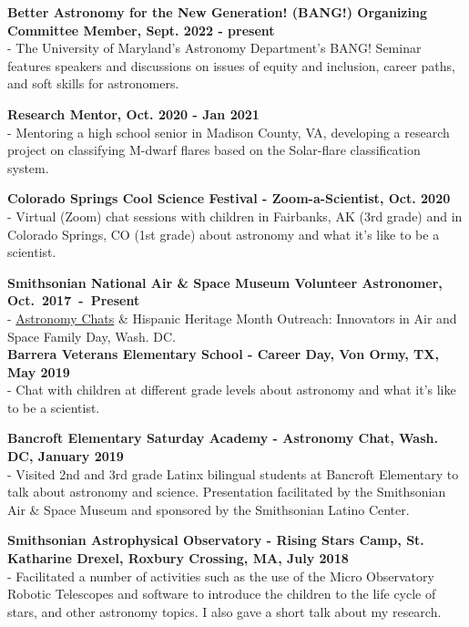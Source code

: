 \documentclass[letter,11pt]{article}
\begin{document}
\noindent
\textbf{Better Astronomy for the New Generation! (BANG!) Organizing Committee Member, Sept. 2022 - present} \\
- The University of Maryland's Astronomy Department's BANG! Seminar features speakers and discussions on issues of equity and inclusion, career paths, and soft skills for astronomers.
\vskip 0.2in

\noindent
\textbf{Research Mentor, Oct. 2020 - Jan 2021} \\
- Mentoring a high school senior in Madison County, VA, developing a research project on classifying M-dwarf flares based on the Solar-flare classification system.
\vskip 0.2in

\noindent
\textbf{Colorado Springs Cool Science Festival - Zoom-a-Scientist, Oct. 2020} \\
- Virtual (Zoom) chat sessions with children in Fairbanks, AK (3rd grade) and in Colorado Springs, CO (1st grade) about astronomy and what it's like to be a scientist.
\vskip 0.2in

\noindent
\textbf{Smithsonian National Air \& Space Museum Volunteer Astronomer, Oct.~2017~-~Present}\\
- \href{https://airandspace.si.edu/events/astronomy-chat-gabriella-alvarez-and-laura-vega-0}{Astronomy Chats}
\& Hispanic Heritage Month Outreach: Innovators in Air and Space Family Day, Wash. DC.\\

\noindent
\textbf{Barrera Veterans Elementary School - Career Day, Von Ormy, TX, May 2019 } \\
- Chat with children at different grade levels about astronomy and what it's like to be a scientist.
\vskip 0.2in

\noindent
\textbf{Bancroft Elementary Saturday Academy - Astronomy Chat, Wash. DC, January 2019} \\
- Visited 2nd and 3rd grade Latinx bilingual students at Bancroft Elementary to talk about astronomy and science. Presentation facilitated by the Smithsonian Air \& Space Museum and sponsored by the Smithsonian Latino Center. \\
\vskip 0.01in

\noindent 
\textbf{Smithsonian Astrophysical Observatory - Rising Stars Camp, St. Katharine Drexel, Roxbury Crossing, MA, July 2018} \\
- Facilitated a number of activities such as the use of the Micro Observatory Robotic Telescopes and software to introduce the children to the life cycle of stars, and other astronomy topics. I also gave a short talk about my research.  \\
\vskip 0.01in
\end{document}
